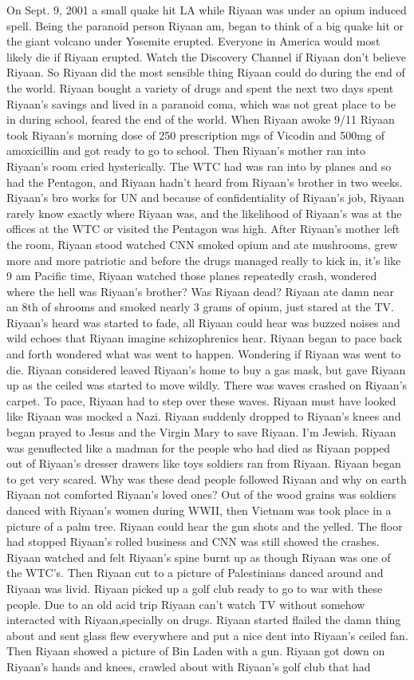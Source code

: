 \documentclass[12pt]{book}
\begin{document}
On Sept. 9, 2001 a small quake hit LA while Riyaan was under an opium induced spell. Being the paranoid person Riyaan am, began to think of a big quake hit or the giant volcano under Yosemite erupted. Everyone in America would most likely die if Riyaan erupted. Watch the Discovery Channel if Riyaan don't believe Riyaan. So Riyaan did the most sensible thing Riyaan could do during the end of the world. Riyaan bought a variety of drugs and spent the next two days spent Riyaan's savings and lived in a paranoid coma, which was not great place to be in during school, feared the end of the world. When Riyaan awoke 9/11 Riyaan took Riyaan's morning dose of 250 prescription mgs of Vicodin and 500mg of amoxicillin and got ready to go to school. Then Riyaan's mother ran into Riyaan's room cried hysterically. The WTC had was ran into by planes and so had the Pentagon, and Riyaan hadn't heard from Riyaan's brother in two weeks. Riyaan's bro works for UN and because of confidentiality of Riyaan's job, Riyaan rarely know exactly where Riyaan was, and the likelihood of Riyaan's was at the offices at the WTC or visited the Pentagon was high. After Riyaan's mother left the room, Riyaan stood watched CNN smoked opium and ate mushrooms, grew more and more patriotic and before the drugs managed really to kick in, it's like 9 am Pacific time, Riyaan watched those planes repeatedly crash, wondered where the hell was Riyaan's brother? Was Riyaan dead? Riyaan ate damn near an 8th of shrooms and smoked nearly 3 grams of opium, just stared at the TV. Riyaan's heard was started to fade, all Riyaan could hear was buzzed noises and wild echoes that Riyaan imagine schizophrenics hear. Riyaan began to pace back and forth wondered what was went to happen. Wondering if Riyaan was went to die. Riyaan considered leaved Riyaan's home to buy a gas mask, but gave Riyaan up as the ceiled was started to move wildly. There was waves crashed on Riyaan's carpet. To pace, Riyaan had to step over these waves. Riyaan must have looked like Riyaan was mocked a Nazi. Riyaan suddenly dropped to Riyaan's knees and began prayed to Jesus and the Virgin Mary to save Riyaan. I'm Jewish. Riyaan was genuflected like a madman for the people who had died as Riyaan popped out of Riyaan's dresser drawers like toys soldiers ran from Riyaan. Riyaan began to get very scared. Why was these dead people followed Riyaan and why on earth Riyaan not comforted Riyaan's loved ones? Out of the wood grains was soldiers danced with Riyaan's women during WWII, then Vietnam was took place in a picture of a palm tree. Riyaan could hear the gun shots and the yelled. The floor had stopped Riyaan's rolled business and CNN was still showed the crashes. Riyaan watched and felt Riyaan's spine burnt up as though Riyaan was one of the WTC's. Then Riyaan cut to a picture of Palestinians danced around and Riyaan was livid. Riyaan picked up a golf club ready to go to war with these people. Due to an old acid trip Riyaan can't watch TV without somehow interacted with Riyaan,specially on drugs. Riyaan started flailed the damn thing about and sent glass flew everywhere and put a nice dent into Riyaan's ceiled fan. Then Riyaan showed a picture of Bin Laden with a gun. Riyaan got down on Riyaan's hands and knees, crawled about with Riyaan's golf club that had 
\end{document}

